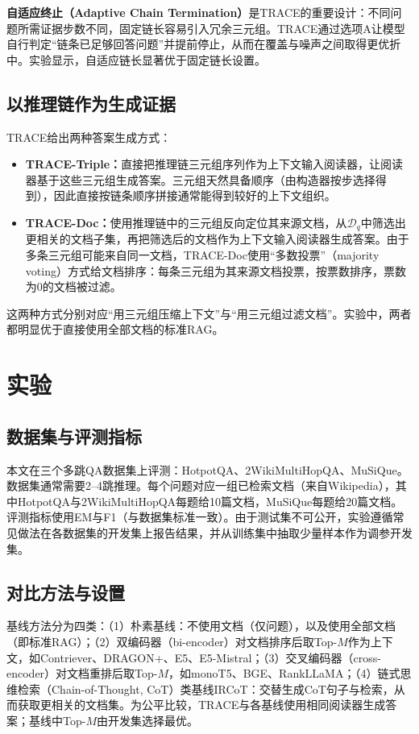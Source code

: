 \textbf{自适应终止（Adaptive Chain Termination）}是TRACE的重要设计：不同问题所需证据步数不同，固定链长容易引入冗余三元组。TRACE通过选项A让模型自行判定“链条已足够回答问题”并提前停止，从而在覆盖与噪声之间取得更优折中。实验显示，自适应链长显著优于固定链长设置。

\subsection{以推理链作为生成证据}
TRACE给出两种答案生成方式：
\begin{itemize}
    \item \textbf{TRACE-Triple：}直接把推理链三元组序列作为上下文输入阅读器，让阅读器基于这些三元组生成答案。三元组天然具备顺序（由构造器按步选择得到），因此直接按链条顺序拼接通常能得到较好的上下文组织。
    \item \textbf{TRACE-Doc：}使用推理链中的三元组反向定位其来源文档，从$\mathcal{D}_q$中筛选出更相关的文档子集，再把筛选后的文档作为上下文输入阅读器生成答案。由于多条三元组可能来自同一文档，TRACE-Doc使用“多数投票”（majority voting）方式给文档排序：每条三元组为其来源文档投票，按票数排序，票数为0的文档被过滤。
\end{itemize}
这两种方式分别对应“用三元组压缩上下文”与“用三元组过滤文档”。实验中，两者都明显优于直接使用全部文档的标准RAG。

\section{实验}
\subsection{数据集与评测指标}
本文在三个多跳QA数据集上评测：HotpotQA、\allowbreak 2Wiki\-MultiHopQA、\allowbreak MuSiQue。数据集通常需要2--4跳推理。每个问题对应一组已检索文档（来自Wikipedia），其中HotpotQA与2Wiki\-MultiHopQA每题给10篇文档，MuSiQue每题给20篇文档。评测指标使用EM与F1（与数据集标准一致）。由于测试集不可公开，实验遵循常见做法在各数据集的开发集上报告结果，并从训练集中抽取少量样本作为调参开发集。

\subsection{对比方法与设置}
基线方法分为四类：（1）朴素基线：不使用文档（仅问题），以及使用全部文档（即标准RAG）；（2）双编码器（bi-encoder）对文档排序后取Top-$M$作为上下文，如Contriever、DRAGON+、E5、E5-Mistral；（3）交叉编码器（cross-encoder）对文档重排后取Top-$M$，如monoT5、BGE、RankLLaMA；（4）链式思维检索（Chain-of-Thought, CoT）类基线IRCoT：交替生成CoT句子与检索，从而获取更相关的文档集。为公平比较，TRACE与各基线使用相同阅读器生成答案；基线中Top-$M$由开发集选择最优。

